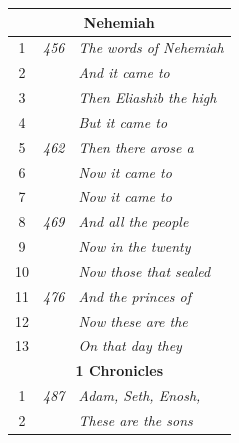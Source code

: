 \documentclass{article}
\newlength{\minipageheight}
\newlength{\minipagewidth}
\begin{document}
\begin{minipage}[r][\minipageheight][t]{\minipagewidth}
\begin{longtable}{ccl}
        \multicolumn{3}{c}{\textbf{Nehemiah}}                           \\
        \hline
        1           & \textit{456} & \textit{The words of Nehemiah}     \\
        2           &              & \textit{And it came to}            \\
        3           &              & \textit{Then Eliashib the high}    \\
        4           &              & \textit{But it came to}            \\
        5           & \textit{462} & \textit{Then there arose a}        \\
        6           &              & \textit{Now it came to}            \\
        7           &              & \textit{Now it came to}            \\
        8           & \textit{469} & \textit{And all the people}        \\
        9           &              & \textit{Now in the twenty}         \\
        10          &              & \textit{Now those that sealed}     \\
        11          & \textit{476} & \textit{And the princes of}        \\
        12          &              & \textit{Now these are the}         \\
        13          &              & \textit{On that day they}          \\

        \multicolumn{3}{c}{\textbf{1 Chronicles}}                       \\
        \hline
        1           & \textit{487} & \textit{Adam, Seth, Enosh,}        \\
        2           &              & \textit{These are the sons}        \\
    \end{longtable}
\end{minipage}%
%
%
\end{document}
